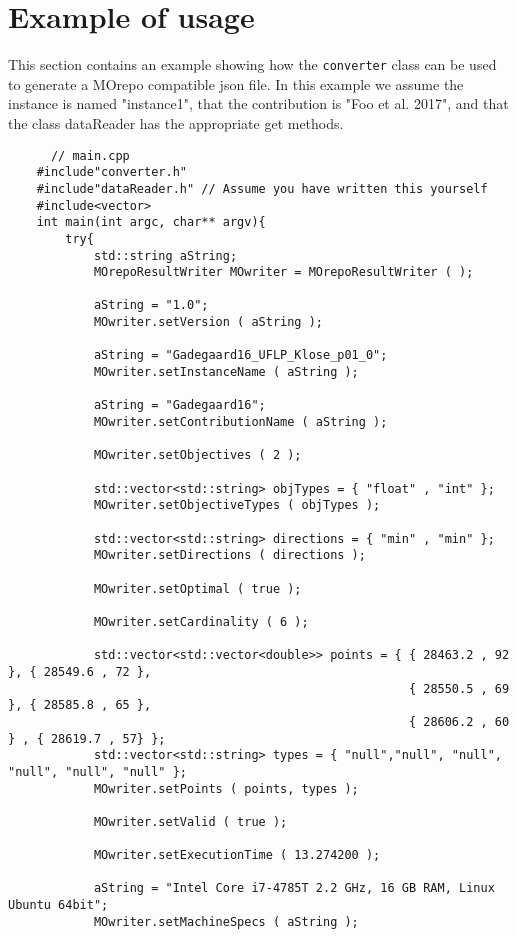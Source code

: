  
   \section{Example of usage}
   This section contains an example showing how the \texttt{converter} class can be used to generate a MOrepo compatible json file. In this example we assume the instance
   is named "instance1", that the contribution is "Foo et al. 2017", and that the class dataReader has the appropriate get methods.

  \begin{lstlisting}
      // main.cpp
    #include"converter.h"
    #include"dataReader.h" // Assume you have written this yourself
    #include<vector>
    int main(int argc, char** argv){
        try{
            std::string aString;
            MOrepoResultWriter MOwriter = MOrepoResultWriter ( );

            aString = "1.0";
            MOwriter.setVersion ( aString );

            aString = "Gadegaard16_UFLP_Klose_p01_0";
            MOwriter.setInstanceName ( aString );

            aString = "Gadegaard16";
            MOwriter.setContributionName ( aString );

            MOwriter.setObjectives ( 2 );

            std::vector<std::string> objTypes = { "float" , "int" };
            MOwriter.setObjectiveTypes ( objTypes );

            std::vector<std::string> directions = { "min" , "min" };
            MOwriter.setDirections ( directions );

            MOwriter.setOptimal ( true );

            MOwriter.setCardinality ( 6 );

            std::vector<std::vector<double>> points = { { 28463.2 , 92 }, { 28549.6 , 72 }, 
                                                        { 28550.5 , 69 }, { 28585.8 , 65 }, 
                                                        { 28606.2 , 60 } , { 28619.7 , 57} };
            std::vector<std::string> types = { "null","null", "null", "null", "null", "null" };
            MOwriter.setPoints ( points, types );

            MOwriter.setValid ( true );

            MOwriter.setExecutionTime ( 13.274200 );
   
            aString = "Intel Core i7-4785T 2.2 GHz, 16 GB RAM, Linux Ubuntu 64bit";
            MOwriter.setMachineSpecs ( aString );


\end{lstlisting}
